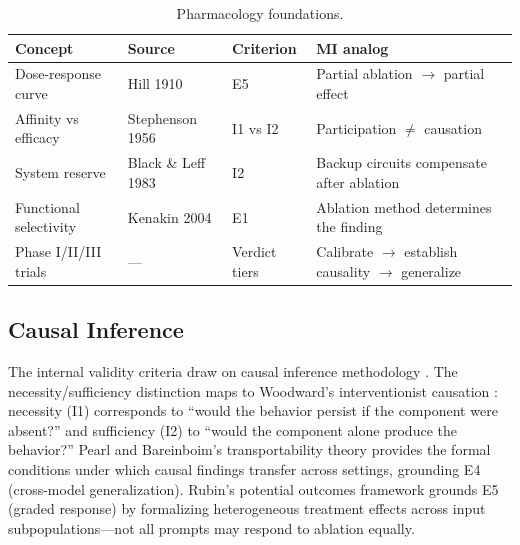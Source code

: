 \documentclass[10pt]{article}
\begin{document}
\begin{table}[H]
\centering\small
\caption{Pharmacology foundations.}
\renewcommand{\arraystretch}{1.12}
\begin{tabular}{@{}l>{\raggedright\arraybackslash}p{2.2cm}l>{\raggedright\arraybackslash}p{4.5cm}@{}}
\toprule
\textbf{Concept} & \textbf{Source} & \textbf{Criterion} & \textbf{MI analog} \\
\midrule
Dose-response curve & Hill 1910 & E5 & Partial ablation $\to$ partial effect \\
\midrule
Affinity vs efficacy & Stephenson 1956 & I1 vs I2 & Participation $\neq$ causation \\
\midrule
System reserve & Black \& Leff 1983 & I2 & Backup circuits compensate after ablation \\
\midrule
Functional selectivity & Kenakin 2004 & E1 & Ablation method determines the finding \\
\midrule
Phase I/II/III trials & --- & Verdict tiers & Calibrate $\to$ establish causality $\to$ generalize \\
\bottomrule
\end{tabular}
\end{table}

\subsection{Causal Inference}
\label{sec:causal}

The internal validity criteria draw on causal inference methodology \citep{pearl2009causality, spirtes2000causation}. The necessity/sufficiency distinction maps to Woodward's interventionist causation \citep{woodward2003making}: necessity (I1) corresponds to ``would the behavior persist if the component were absent?'' and sufficiency (I2) to ``would the component alone produce the behavior?'' Pearl and Bareinboim's transportability theory \citep{pearl2011transportability} provides the formal conditions under which causal findings transfer across settings, grounding E4 (cross-model generalization). Rubin's potential outcomes framework grounds E5 (graded response) by formalizing heterogeneous treatment effects across input subpopulations---not all prompts may respond to ablation equally.
\end{document}
